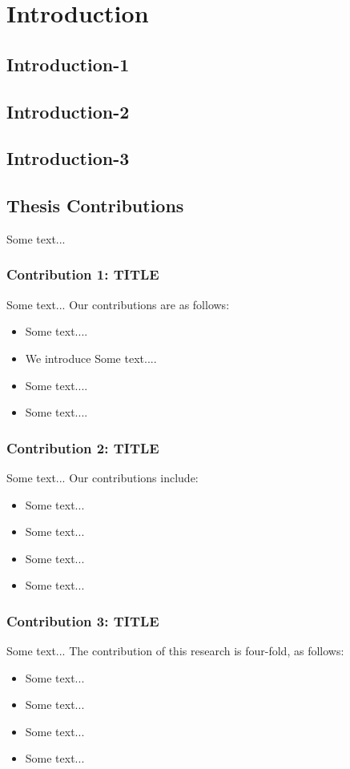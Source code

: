 \chapter{Introduction}\label{ch1-intro}

\section{Introduction-1}

\section{Introduction-2}

\section{Introduction-3}

\section{Thesis Contributions}
Some text... \\

\subsection{Contribution 1: TITLE}
Some text...
Our contributions are as follows:\\
\begin{itemize}
	\item Some text....
	\item We introduce Some text....
	\item Some text....
	\item Some text....
\end{itemize}  
\subsection{Contribution 2: TITLE}
Some text...
Our contributions include:\\
\begin{itemize}
	\item Some text...
	\item Some text...
	\item Some text...
	\item Some text...
\end{itemize} 
\subsection{Contribution 3: TITLE}
Some text... The contribution of this research is four-fold, as follows:\\
\begin{itemize}
	\item Some text...
	\item Some text...	
	\item Some text... 
	\item Some text... 
\end{itemize}
